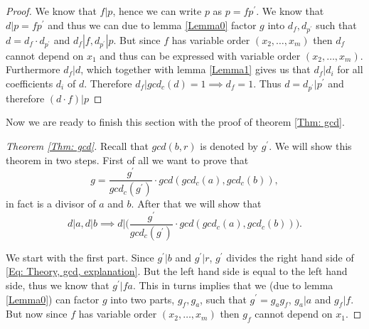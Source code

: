 \begin{proof}
  We know that $f|p$, hence we can write $p$ as $p=fp^\prime$. We know that $d|p=fp^\prime$ and thus we can due to lemma \ref{Lemma0} factor $g$ into $d_f,d_{p^\prime}$ such that $d=d_f\cdot d_{p^\prime}$ and $d_f|f,d_{p^\prime}|p$. But since $f$ has variable order $(x_2,\ldots,x_m)$ then $d_f$ cannot depend on $x_1$ and thus can be expressed with variable order $(x_2,\ldots,x_m)$. Furthermore $d_f|d$, which together with lemma \ref{Lemma1} gives us that $d_f|d_i$ for all coefficients $d_i$ of $d$. Therefore $d_f|gcd_c(d)=1\implies d_f=1$. Thus $d=d_{p^\prime}|p^\prime$ and therefore $(d\cdot f)|p$
\end{proof}
Now we are ready to finish this section with the proof of theorem \ref{Thm: gcd}.
\begin{proof}[Theorem \ref{Thm: gcd}]
  Recall that $gcd(b,r)$ is denoted by $g^\prime$. We will show this theorem in two steps. First of all we want to prove that
  \begin{equation}
    g=\frac{g^\prime}{gcd_c(g^\prime)}\cdot gcd(gcd_c(a),gcd_c(b)),
  \end{equation}
  in fact is a divisor of $a$ and $b$. After that we will show that
  \begin{equation}
    d|a, d|b \implies d\Big|\Big(\frac{g^\prime}{gcd_c(g^\prime)}\cdot gcd(gcd_c(a),gcd_c(b))\Big).
  \end{equation}

  We start with the first part. Since $g^\prime|b$ and $g^\prime|r$, $g^\prime$ divides the right hand side of \ref{Eq: Theory, gcd, explanation}. But the left hand side is equal to the left hand side, thus we know that $g^\prime|fa$. This in turns implies that we (due to lemma \ref{Lemma0}) can factor $g$ into two parts, $g_f,g_a$, such that $g^\prime=g_ag_f$, $g_a|a$ and $g_f|f$. But now since $f$ has variable order $(x_2,\ldots,x_m)$ then $g_f$ cannot depend on $x_1$.


\end{proof}
